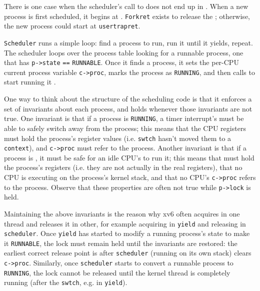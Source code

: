 There is one case when the scheduler's call to
does not end up in
.
When a new process is first scheduled, it begins at
.
\lstinline{Forkret}
exists to release the 
;
otherwise, the new process could start at
\lstinline{usertrapret}.

\lstinline{Scheduler}
runs a simple loop:
find a process to run, run it until it yields, repeat.
The scheduler
loops over the process table
looking for a runnable process, one that has
\lstinline{p->state} 
\lstinline{==}
\lstinline{RUNNABLE}.
Once it finds a process, it sets the per-CPU current process
variable
\lstinline{c->proc},
marks the process as
\lstinline{RUNNING},
and then calls
to start running it
.

One way to think about the structure of the scheduling code is
that it enforces a set of invariants about each process,
and holds
whenever those invariants are not true.
One invariant is that if a process is
\lstinline{RUNNING},
a timer interrupt's
must be able to safely switch away from the process;
this means that the CPU registers must hold the process's register values
(i.e. 
\lstinline{swtch}
hasn't moved them to a
\lstinline{context}),
and
\lstinline{c->proc}
must refer to the process.
Another invariant is that if a process is
,
it must be safe for
an idle CPU's
to run it;
this means that 
must hold the process's registers (i.e. they are
not actually in the real registers),
that no CPU is executing on the process's kernel stack,
and that no CPU's
\lstinline{c->proc}
refers to the process.
Observe that these properties are often not true while
\lstinline{p->lock} is held.

Maintaining the above invariants is the reason why xv6 often acquires 
in one thread and releases it in other,
for example acquiring in
\lstinline{yield}
and releasing in
\lstinline{scheduler}.
Once \lstinline{yield} has started to modify a running process's state
to make it
\lstinline{RUNNABLE},
the lock must remain held until the invariants are restored:
the earliest correct release point is after
\lstinline{scheduler}
(running on its own stack)
clears
\lstinline{c->proc}.
Similarly, once 
\lstinline{scheduler}
starts to convert a runnable process to
\lstinline{RUNNING},
the lock cannot be released until the kernel thread
is completely running (after the
\lstinline{swtch},
e.g. in
\lstinline{yield}).

